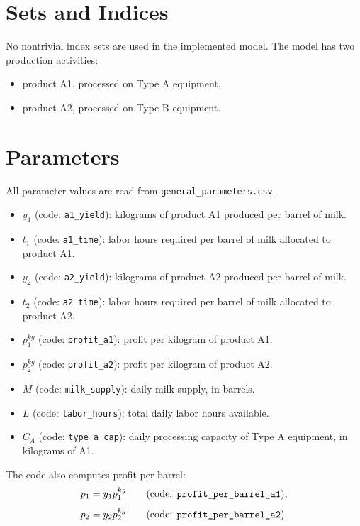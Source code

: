 \section*{Sets and Indices}

No nontrivial index sets are used in the implemented model. The model has two production activities:
\begin{itemize}
    \item product A1, processed on Type A equipment,
    \item product A2, processed on Type B equipment.
\end{itemize}

\section*{Parameters}

All parameter values are read from \texttt{general\_parameters.csv}.

\begin{itemize}
    \item $y_{1}$ (code: \texttt{a1\_yield}): kilograms of product A1 produced per barrel of milk.
    \item $t_{1}$ (code: \texttt{a1\_time}): labor hours required per barrel of milk allocated to product A1.
    \item $y_{2}$ (code: \texttt{a2\_yield}): kilograms of product A2 produced per barrel of milk.
    \item $t_{2}$ (code: \texttt{a2\_time}): labor hours required per barrel of milk allocated to product A2.
    \item $p_{1}^{kg}$ (code: \texttt{profit\_a1}): profit per kilogram of product A1.
    \item $p_{2}^{kg}$ (code: \texttt{profit\_a2}): profit per kilogram of product A2.
    \item $M$ (code: \texttt{milk\_supply}): daily milk supply, in barrels.
    \item $L$ (code: \texttt{labor\_hours}): total daily labor hours available.
    \item $C_A$ (code: \texttt{type\_a\_cap}): daily processing capacity of Type A equipment, in kilograms of A1.
\end{itemize}

The code also computes profit per barrel:
\[
p_1 = y_1 p_1^{kg}
\qquad\text{(code: \texttt{profit\_per\_barrel\_a1})},
\]
\[
p_2 = y_2 p_2^{kg}
\qquad\text{(code: \texttt{profit\_per\_barrel\_a2})}.
\]

